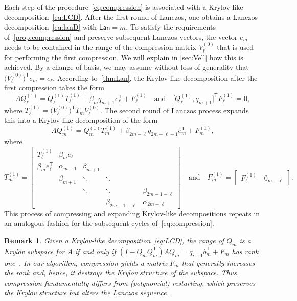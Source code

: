 \documentclass{siamart190516}
\newcommand{\Ttran}{\mathsf{T}}
\newcommand{\lan}{\mathsf{Lan}}
\newtheorem{remark}[theorem]{Remark}
\begin{document}
Each step of the procedure~\eqref{eq:compression} is associated with a Krylov-like decomposition~\cref{eq:LCD}.
After the first round of Lanczos, one obtains a Lanczos decomposition~\cref{eq:lanD} with $\lan = m$.
To satisfy the requirements of~\cref{prop:compression} and preserve subsequent Lanczos vectors, the vector $e_{m}$ needs to be contained in the range of the compression matrix $V_{\ell}^{(0)}$ that is used for performing the first compression. We will explain in \cref{sec:Vell} how this is achieved. 
By a change of basis, we may assume without loss of generality  
that $\big( V_{\ell}^{(0)}\big)^{\Ttran}e_{m}=e_{\ell}$.
According to~\cref{thmLan}, the Krylov-like decomposition after the first compression takes the form
\begin{equation}
    \label{eq:Tcompression}
    AQ_{\ell}^{(1)} = Q_{\ell}^{(1)}T_{\ell}^{(1)}+\beta_{m}q_{m+1}e_{\ell}^{\Ttran}+F_{\ell}^{(1)}
    \quad\text{and}\quad  \big[ Q_{\ell}^{(1)}, q_{m+1}  \big]^\Ttran F_{\ell}^{(1)} = 0,
\end{equation}
where $T^{(1)}_{\ell} = \big( V^{(0)}_{\ell} \big)^{\Ttran}T_{m}V^{(0)}_{\ell}$.
The second round of Lanczos process expands this into a Krylov-like decomposition of the form 
\begin{equation*}
    AQ_{m}^{(1)} = Q_{m}^{(1)}T_{m}^{(1)}+\beta_{2m-\ell}q_{2m-\ell+1}e_{m}^{\Ttran}+F_{m}^{(1)},
\end{equation*}
where 
\begin{equation*}
    T_{m}^{(1)} = \begin{bmatrix}
        T_{\ell}^{(1)} & \beta_{m}e_{\ell} & &\\ 
        \beta_{m}e_{\ell}^{\Ttran} & \alpha_{m+1} & \beta_{m+1} & \\ 
        & \beta_{m+1} & \ddots &\ddots& \\
        &  & \ddots &\ddots& \beta_{2m-1-\ell}\\
        && &\beta_{2m-1-\ell} & \alpha_{2m-\ell}
    \end{bmatrix}
    \quad\text{and}\quad 
    F_{m}^{(1)} = \begin{bmatrix}
        F_{\ell}^{(1)} \quad  0_{m-\ell}    
    \end{bmatrix}.
\end{equation*} 
This process of compressing and expanding Krylov-like decompositions repeats in an analogous fashion for the subsequent cycles of~\cref{eq:compression}.


\begin{remark}
    Given a Krylov-like decomposition~\cref{eq:LCD}, the range of $Q_{m}$ is a Krylov subspace for $A$ if and only if $(I-Q_{m}Q_{m}^{\Ttran})AQ_{m}=q_{i+1}b_{m}^{\Ttran}+F_{m}$ has rank one~\cite[Chap. 5, Thm. 1.1]{Stewart2001}.
    In our algorithm, compression yields a matrix $F_m$ that generally increases the rank and, hence, it destroys the Krylov structure of the subspace. Thus, compression fundamentally differs from (polynomial) restarting, which preserves the Krylov structure but alters the Lanczos sequence.
\end{remark}
\end{document}
